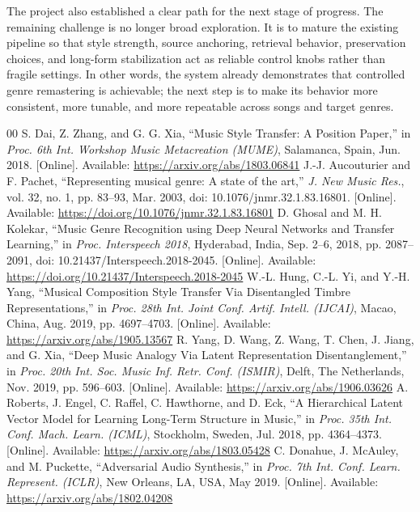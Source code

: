 \documentclass[conference]{IEEEtran}
\begin{document}
The project also established a clear path for the next stage of progress. The remaining challenge is no longer broad exploration. It is to mature the existing pipeline so that style strength, source anchoring, retrieval behavior, preservation choices, and long-form stabilization act as reliable control knobs rather than fragile settings. In other words, the system already demonstrates that controlled genre remastering is achievable; the next step is to make its behavior more consistent, more tunable, and more repeatable across songs and target genres.

\begin{thebibliography}{00}
 S. Dai, Z. Zhang, and G. G. Xia, ``Music Style Transfer: A Position Paper,'' in \textit{Proc. 6th Int. Workshop Music Metacreation (MUME)}, Salamanca, Spain, Jun. 2018. [Online]. Available: \url{https://arxiv.org/abs/1803.06841}
 J.-J. Aucouturier and F. Pachet, ``Representing musical genre: A state of the art,'' \textit{J. New Music Res.}, vol. 32, no. 1, pp. 83--93, Mar. 2003, doi: 10.1076/jnmr.32.1.83.16801. [Online]. Available: \url{https://doi.org/10.1076/jnmr.32.1.83.16801}
 D. Ghosal and M. H. Kolekar, ``Music Genre Recognition using Deep Neural Networks and Transfer Learning,'' in \textit{Proc. Interspeech 2018}, Hyderabad, India, Sep. 2--6, 2018, pp. 2087--2091, doi: 10.21437/Interspeech.2018-2045. [Online]. Available: \url{https://doi.org/10.21437/Interspeech.2018-2045}
 W.-L. Hung, C.-L. Yi, and Y.-H. Yang, ``Musical Composition Style Transfer Via Disentangled Timbre Representations,'' in \textit{Proc. 28th Int. Joint Conf. Artif. Intell. (IJCAI)}, Macao, China, Aug. 2019, pp. 4697--4703. [Online]. Available: \url{https://arxiv.org/abs/1905.13567}
 R. Yang, D. Wang, Z. Wang, T. Chen, J. Jiang, and G. Xia, ``Deep Music Analogy Via Latent Representation Disentanglement,'' in \textit{Proc. 20th Int. Soc. Music Inf. Retr. Conf. (ISMIR)}, Delft, The Netherlands, Nov. 2019, pp. 596--603. [Online]. Available: \url{https://arxiv.org/abs/1906.03626}
 A. Roberts, J. Engel, C. Raffel, C. Hawthorne, and D. Eck, ``A Hierarchical Latent Vector Model for Learning Long-Term Structure in Music,'' in \textit{Proc. 35th Int. Conf. Mach. Learn. (ICML)}, Stockholm, Sweden, Jul. 2018, pp. 4364--4373. [Online]. Available: \url{https://arxiv.org/abs/1803.05428}
 C. Donahue, J. McAuley, and M. Puckette, ``Adversarial Audio Synthesis,'' in \textit{Proc. 7th Int. Conf. Learn. Represent. (ICLR)}, New Orleans, LA, USA, May 2019. [Online]. Available: \url{https://arxiv.org/abs/1802.04208}

\end{thebibliography}
\end{document}
